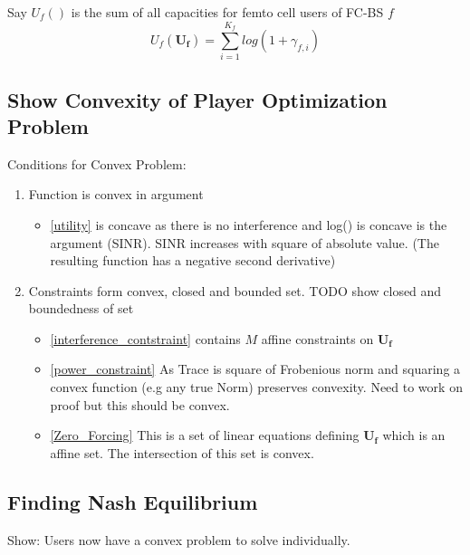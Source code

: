 \documentclass[12pt]{article}
\begin{document}
Say $U_f() $ is the sum of all capacities for femto cell users of FC-BS $f$ 
\begin{displaymath}
U_f(\mathbf{U_f}) = \sum^{K_f}_{i=1} log(1+\gamma_{f,i})
\end{displaymath}

\subsection{Show Convexity of Player Optimization Problem}

Conditions for Convex Problem:

\begin{enumerate}
\item Function is convex in argument 
\begin{itemize}
\item\eqref{utility} is concave as there is no interference and log() is concave is the argument (SINR). SINR increases with square of absolute value. (The resulting function has a negative second derivative)

\end{itemize}

\item Constraints  form convex, closed and bounded set. TODO show closed and boundedness of set

\begin{itemize}

\item\eqref{interference_contstraint} contains $M$ affine constraints on $\mathbf{U_f}$

\item\eqref{power_constraint} As Trace is square of Frobenious norm and squaring a convex function (e.g any true Norm) preserves convexity.
Need to work on proof but this should be convex.

\item\eqref{Zero_Forcing} This is a set of linear equations defining $\mathbf{U_f}$ which is an affine set. The intersection of this set is convex.

\end{itemize}
\end{enumerate}

\subsection{Finding Nash Equilibrium}

Show: Users now have a convex problem to solve individually.
\end{document}
